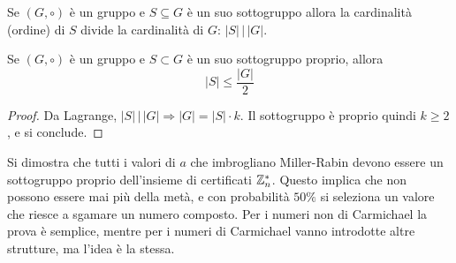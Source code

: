\begin{theorem}
    [Lagrange]
    \label{teo:lagrange}
    Se $
    \left( 
        G, \circ
    \right)
    $ è un gruppo e $
    S \subseteq G
    $ è un suo sottogruppo allora la cardinalità (ordine) di $S$ divide la cardinalità di $G$:
    $
    |S|
    \,
    \big|
    \,
    |G|
    $.
\end{theorem}

\begin{corollario}
    Se $
    \left( 
        G, \circ
    \right)
    $ è un gruppo e $
    S \subset G
    $ è un suo sottogruppo proprio, allora
    \begin{equation*}
        |S|
        \leq
        \frac{|G|}{2}
    \end{equation*}
    \begin{proof}
        Da Lagrange,
        $
        |S|
        \,
        \big|
        \,
        |G|
        \Rightarrow
        |G| = |S| \cdot k
        $.
        Il sottogruppo è proprio quindi $
        k \geq 2
        $, e si conclude.
    \end{proof}
\end{corollario}
Si dimostra che tutti i valori di $a$ che imbrogliano Miller-Rabin devono essere un sottogruppo proprio dell'insieme di certificati $
\mathbb{Z}_{n}^{*} 
$.
Questo implica che non possono essere mai più della metà, e con probabilità $50\%$ si seleziona un valore che riesce a sgamare un numero composto.
Per i numeri non di Carmichael la prova è semplice, mentre per i numeri di Carmichael vanno introdotte altre strutture, ma l'idea è la stessa.


